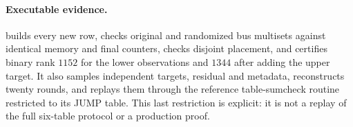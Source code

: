 \paragraph{Executable evidence.}  builds every new row, checks original and randomized bus multisets against identical memory and final counters, checks disjoint placement, and certifies binary rank $1152$ for the lower observations and $1344$ after adding the upper target. It also samples independent targets, residual and metadata, reconstructs twenty rounds, and replays them through the reference table-sumcheck routine restricted to its JUMP table. This last restriction is explicit: it is not a replay of the full six-table protocol or a production proof.
